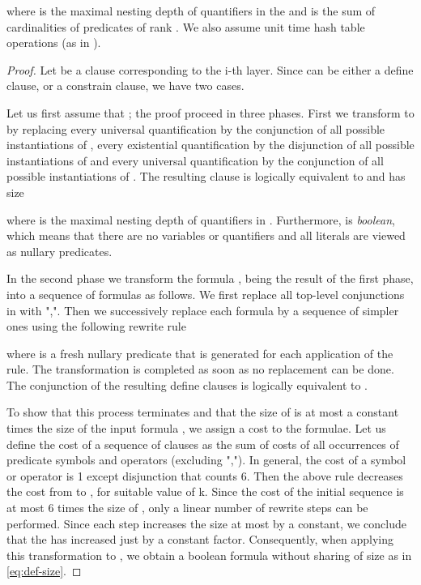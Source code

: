 where  is the maximal nesting depth of quantifiers in the 
and  is the sum of cardinalities of predicates
 of rank . We also assume unit time hash table
operations (as in \cite{bib:complex}).
\begin{proof}
  Let  be a clause corresponding to the i-th layer. Since 
  can be either a define clause, or a constrain clause, we have two
  cases.

  Let us first assume that ; the proof proceed in
  three phases. First we transform  to  by replacing
  every universal quantification  by the conjunction
  of all  possible instantiations of , every existential
  quantification  by the disjunction of all 
  possible instantiations of  and every universal quantification
   by the conjunction of all  possible
  instantiations of . The resulting clause 
  is logically equivalent to  and has size
  
  where  is the maximal nesting depth of quantifiers in .
  Furthermore,  is {\it boolean}, which means that there are
  no variables or quantifiers and all literals are viewed as nullary
  predicates.



  In the second phase we transform the formula , being the
  result of the first phase, into a sequence of formulas
   as follows. We first replace
  all top-level conjunctions in  with ",". Then we
  successively replace each formula by a sequence of simpler ones
  using the following rewrite rule
 
where
   is a fresh nullary predicate that is generated for each
  application of the rule. The transformation is completed as soon as no
  replacement can be done. The conjunction of the resulting define
  clauses is logically equivalent to .

  To show that this process terminates and that the size of  is
  at most a constant times the size of the input formula  , we
  assign a cost to the formulae.  Let us define the cost of a sequence
  of clauses as the sum of costs of all occurrences of predicate
  symbols and operators (excluding ","). In general, the cost of
  a symbol or operator is 1 except disjunction that counts 6. Then the
  above rule decreases the cost from  to , for suitable
  value of k. Since the cost of the initial sequence is at most 6
  times the size of , only a linear number of rewrite steps can
  be performed. Since each step increases the size at most by a
  constant, we conclude that the  has increased just by a
  constant factor. Consequently, when applying this transformation to
  , we obtain a boolean formula without sharing of size as in
  \eqref{eq:def-size}.  


\end{proof}

